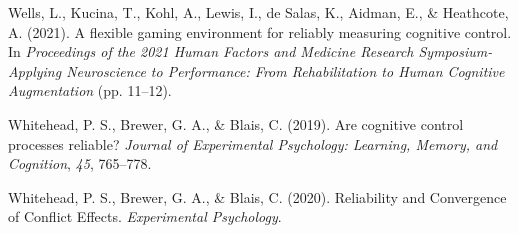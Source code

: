 \documentclass[
  ,man]{apa6}
\newlength{\cslhangindent}
\newlength{\cslentryspacingunit} %
\newenvironment{CSLReferences}[2] %
 {%
  \setlength{\parindent}{0pt}
  \ifodd #1
  \let\oldpar\par
  \def\par{\hangindent=\cslhangindent\oldpar}
  \fi
  \setlength{\parskip}{#2\cslentryspacingunit}
 }%
 {}
\begin{document}
\begin{CSLReferences}{1}{0}
\leavevmode{}%
Wells, L., Kucina, T., Kohl, A., Lewis, I., de Salas, K., Aidman, E., \& Heathcote, A. (2021). A flexible gaming environment for reliably measuring cognitive control. In \emph{Proceedings of the 2021 {Human Factors} and {Medicine Research Symposium-Applying Neuroscience} to {Performance}: {From Rehabilitation} to {Human Cognitive Augmentation}} (pp. 11--12).

\leavevmode{}%
Whitehead, P. S., Brewer, G. A., \& Blais, C. (2019). Are cognitive control processes reliable? \emph{Journal of Experimental Psychology: Learning, Memory, and Cognition}, \emph{45}, 765--778.

\leavevmode{}%
Whitehead, P. S., Brewer, G. A., \& Blais, C. (2020). Reliability and {Convergence} of {Conflict Effects}. \emph{Experimental Psychology}.

\end{CSLReferences}
\end{document}
